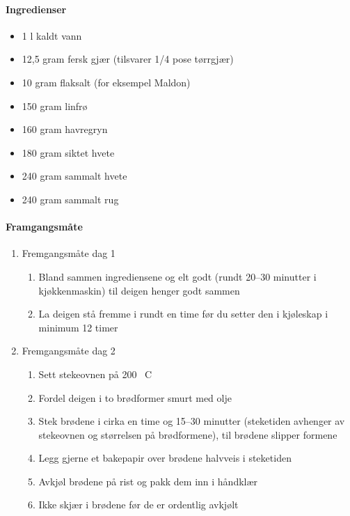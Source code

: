 \documentclass[12pt,a4paper]{book}
\begin{document}
\paragraph{Ingredienser}
\begin{itemize}[noitemsep]
	\item 1 l kaldt vann
	\item 12,5 gram fersk gjær (tilsvarer 1/4 pose tørrgjær)
	\item 10 gram flaksalt (for eksempel Maldon)
	\item 150 gram  linfrø
	\item 160 gram  havregryn
	\item 180 gram  siktet hvete
	\item 240 gram  sammalt hvete
	\item 240 gram  sammalt rug
\end{itemize}

\paragraph{Framgangsmåte}
\begin{enumerate}[noitemsep]
	\item Fremgangsmåte dag 1
	\begin{enumerate}[noitemsep]
		\item Bland sammen ingrediensene og elt godt (rundt 20--30 minutter i kjøkkenmaskin) til deigen henger godt sammen
		\item La deigen stå fremme i rundt en time før du setter den i kjøleskap i minimum 12 timer
	\end{enumerate}
	\item Fremgangsmåte dag 2
	\begin{enumerate}[noitemsep]

		\item Sett stekeovnen på 200 \degree~C
		\item Fordel deigen i to brødformer smurt med olje
		\item Stek brødene i cirka en time og 15--30 minutter (steketiden avhenger av stekeovnen og størrelsen på brødformene), til brødene slipper formene
		\item Legg gjerne et bakepapir over brødene halvveis i steketiden
		\item Avkjøl brødene på rist og pakk dem inn i håndklær
		\item Ikke skjær i brødene før de er ordentlig avkjølt
	\end{enumerate}
\end{enumerate}
\end{document}
